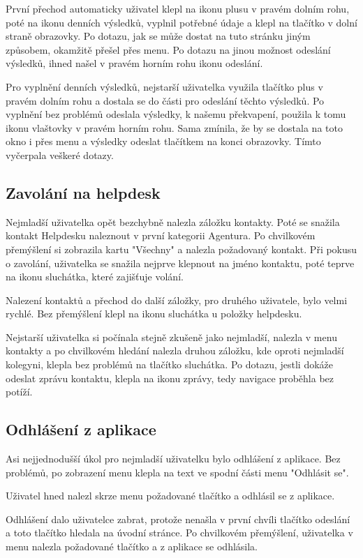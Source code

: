 \documentclass[11pt,twoside,a4paper]{book}
\begin{document}
První přechod automaticky uživatel klepl na ikonu plusu v pravém dolním rohu, poté na ikonu denních výsledků, vyplnil potřebné údaje a klepl na tlačítko v dolní straně obrazovky. Po dotazu, jak se může dostat na tuto stránku jiným způsobem, okamžitě přešel přes menu. Po dotazu na jinou možnost odeslání výsledků, ihned našel v pravém horním rohu ikonu odeslání.

Pro vyplnění denních výsledků, nejstarší uživatelka využila tlačítko plus v pravém dolním rohu a dostala se do části pro odeslání těchto výsledků. Po vyplnění bez problémů odeslala výsledky, k našemu překvapení, použila k tomu ikonu vlaštovky v pravém horním rohu. Sama zmínila, že by se dostala na toto okno i přes menu a výsledky odeslat tlačítkem na konci obrazovky. Tímto vyčerpala veškeré dotazy.

\subsection{Zavolání na helpdesk}
Nejmladší uživatelka opět bezchybně nalezla záložku kontakty. Poté se snažila kontakt Helpdesku naleznout v první kategorii Agentura. Po chvilkovém přemýšlení si zobrazila kartu "Všechny" a nalezla požadovaný kontakt. Při pokusu o zavolání, uživatelka se snažila nejprve klepnout na jméno kontaktu, poté teprve na ikonu sluchátka, které zajišťuje volání.

Nalezení kontaktů a přechod do další záložky, pro druhého uživatele, bylo velmi rychlé. Bez přemýšlení klepl na ikonu sluchátka u položky helpdesku. 

Nejstarší uživatelka si počínala stejně zkušeně jako nejmladší, nalezla v menu kontakty a po chvilkovém hledání nalezla druhou záložku, kde oproti nejmladší kolegyni, klepla bez problémů na tlačítko sluchátka. Po dotazu, jestli dokáže odeslat zprávu kontaktu, klepla na ikonu zprávy, tedy navigace proběhla bez potíží.

\subsection{Odhlášení z aplikace}
Asi nejjednodušší úkol pro nejmladší uživatelku bylo odhlášení z aplikace. Bez problémů, po zobrazení menu klepla na text ve spodní části menu "Odhlásit se".

Uživatel hned nalezl skrze menu požadované tlačítko a odhlásil se z aplikace.

Odhlášení dalo uživatelce zabrat, protože nenašla v první chvíli tlačítko odeslání a toto tlačítko hledala na úvodní stránce. Po chvilkovém přemýšlení, uživatelka v menu nalezla požadované tlačítko a z aplikace se odhlásila.
\end{document}

